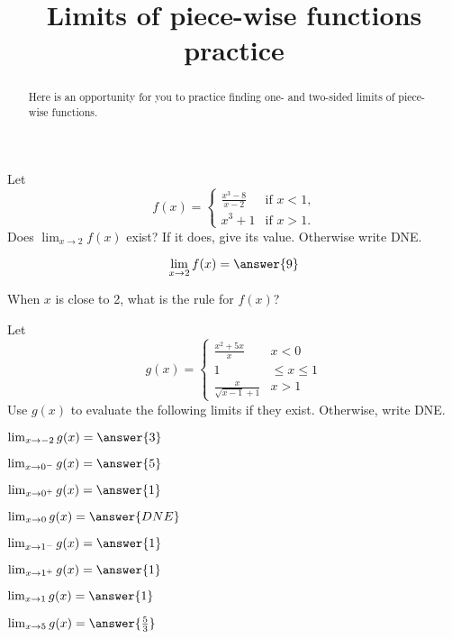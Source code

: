 \documentclass[handout]{ximera}
\title[Exercises:]{Limits of piece-wise functions practice}
\begin{document}
\begin{abstract}
Here is an opportunity for you to practice finding one- and two-sided limits of piece-wise functions.
\end{abstract}
\maketitle

\begin{exercise}
Let
\[
f(x) = \begin{cases}
  \frac{x^3 - 8}{x-2}  &\text{if $x<1$,} \\
  x^3+1 &\text{if  $x>1$.}
\end{cases}
\]
Does $\displaystyle\lim_{x \to 2} f(x)$ exist?  If it does, give its value.
Otherwise write DNE.

\[
\lim_{x \to 2} f(x) = \answer{9}
\]

\begin{hint}
When $x$ is close to 2, what is the rule for $f(x)$?
\end{hint}

\end{exercise}

\begin{exercise}
Let
\[
g(x) = \begin{cases}
  \frac{x^2+5x}{x}  & x<0 \\
  1 & \leq x \leq 1 \\
  \frac{x}{\sqrt{x-1} +1} & x>1
\end{cases}
\]
Use $g(x)$ to evaluate the following limits if they exist.  Otherwise, write DNE.

\begin{itemize}

\begin{multicols}{2}

\item [] $\lim_{x \to -2} g(x) = \answer{3}$

\item [] $\lim_{x \to 0^-} g(x) = \answer{5}$

\item [] $\lim_{x \to 0^+} g(x) = \answer{1}$

\item [] $\lim_{x \to 0} g(x) = \answer{DNE}$

\item [] $\lim_{x \to 1^-} g(x) = \answer{1}$

\item [] $\lim_{x \to 1^+} g(x) = \answer{1}$

\item [] $\lim_{x \to 1} g(x) = \answer{1}$

\item [] $\lim_{x \to 5} g(x) = \answer{\frac{5}{3}}$

\end{multicols}

\end{itemize}

\begin{hint}
\end{hint}

\end{exercise}
\end{document}
